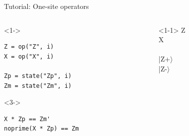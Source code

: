 \begin{frame}[fragile]{Tutorial: One-site operators}

\begin{columns}

\begin{column}{4.5cm}

\begin{onlyenv}<1->
\begin{lstlisting}[language=JuliaLocal, style=julia, basicstyle=\scriptsize\ttfamily]
Z = op("Z", i)
X = op("X", i)

Zp = state("Zp", i)
Zm = state("Zm", i)
\end{lstlisting}
\end{onlyenv}

\begin{onlyenv}<3->
\begin{lstlisting}[language=JuliaLocal, style=julia, basicstyle=\scriptsize\ttfamily]
X * Zp == Zm'
noprime(X * Zp) == Zm
\end{lstlisting}
\end{onlyenv}

\end{column}

\begin{column}{4.5cm}

\begin{onlyenv}<1-1>
Z \\
X \\
~\\
|Z+$\rangle$ \\
|Z-$\rangle$ \\
\end{onlyenv}


\end{column}
\end{columns}
\end{frame}
